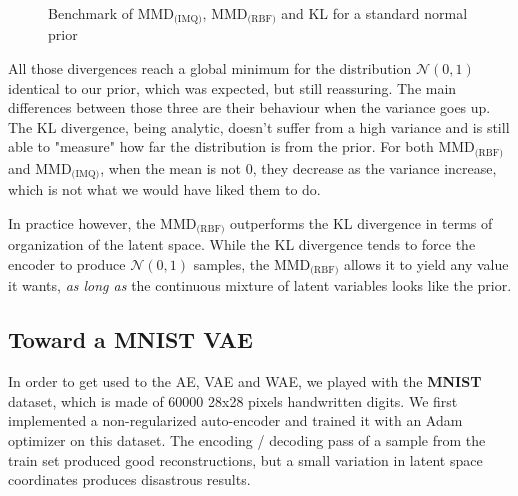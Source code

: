 \documentclass[11pt, english]{article}
\begin{document}
\begin{figure}[H]
\begin{minipage}[t]{.35\linewidth}
   \end{minipage}
    \caption{Benchmark of MMD$_{\text{(IMQ)}}$, MMD$_{\text{(RBF)}}$ and KL for a standard normal prior}
    \label{fig:bench}
\end{figure}


All those divergences reach a global minimum for the distribution $\mathcal N(0,1)$ identical to our prior, which was expected, but still reassuring. The main differences between those three are their behaviour when the variance goes up. The KL divergence, being analytic, doesn't suffer from a high variance and is still able to "measure" how far the distribution is from the prior. For both MMD$_{\text{(RBF)}}$ and MMD$_{\text{(IMQ)}}$, when the mean is not 0, they decrease as the variance increase, which is not what we would have liked them to do.\newline

In practice however, the MMD$_{\text{(RBF)}}$ outperforms the KL divergence in terms of organization of the latent space. While the KL divergence tends to force the encoder to produce $\mathcal N(0,1)$ samples, the MMD$_{\text{(RBF)}}$ allows it to yield any value it wants, \textit{as long as} the continuous mixture of latent variables looks like the prior.

\subsection{Toward a MNIST VAE}

In order to get used to the AE, VAE and WAE, we played with the \textbf{MNIST} dataset, which is made of 60000 28x28 pixels handwritten digits. We first implemented a non-regularized auto-encoder and trained it with an Adam optimizer on this dataset. The encoding / decoding pass of a sample from the train set produced good reconstructions, but a small variation in latent space coordinates produces disastrous results.
\end{document}
